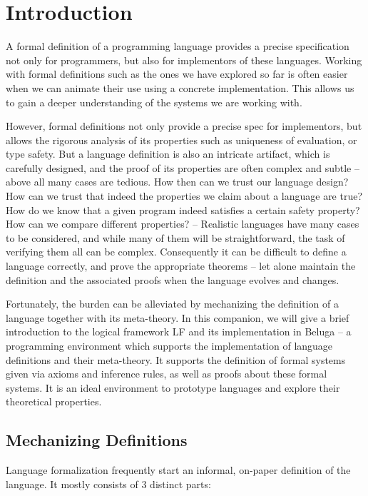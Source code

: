 \chapter{Introduction}

A formal definition of a programming language
provides a precise specification not only for programmers, but also
for implementors of these languages. Working with formal definitions such as the
ones we have explored so far is often easier when we can animate their use using
a concrete implementation. This allows us to gain a deeper understanding of the
systems we are working with.

However, formal definitions not only provide a precise spec for implementors,
but allows the rigorous analysis of its properties such as uniqueness of
evaluation, or type safety. But a language definition is also an
intricate artifact, which is carefully designed, and the proof of its
properties are often complex and subtle --  above all many cases are
tedious. How then can we trust our language design? How can we trust
that indeed the properties we claim about a language are true? How do
we know that a given program indeed satisfies a certain safety
property? How can we compare different properties? --  
%
Realistic languages have many cases to be considered, and while many
of them will be straightforward, the task of verifying them all can
be complex. Consequently it can be difficult to define a language
correctly, and prove the appropriate theorems -- let alone maintain
the definition and the associated proofs when the language evolves and
changes.  

Fortunately, the burden can be alleviated by mechanizing the
definition of a language together with its meta-theory. In this companion,
we will give a brief introduction to the logical framework LF \citep{Harper93jacm} and its
implementation in Beluga \citep{Pientka:POPL08,Pientka:PPDP08,Pientka:IJCAR10,Cave:POPL12} -- a programming environment which
supports the implementation of language definitions and their
meta-theory. It supports the definition of formal systems given via
axioms and inference rules, as well as proofs about these formal
systems. It is an ideal environment to prototype languages and explore their
theoretical properties. %


\section{Mechanizing Definitions} Language formalization frequently
start an informal, on-paper definition of the language. It mostly
consists of 3 distinct parts: 

